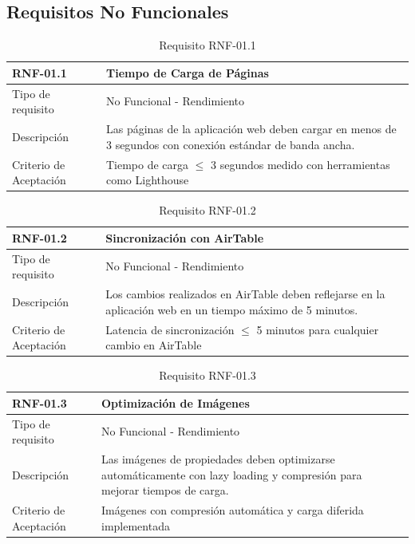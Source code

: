 \subsection{Requisitos No Funcionales}



\begin{table}[H]
\centering
\begin{tabular}{|p{3cm}|p{10cm}|}
\hline
\rowcolor{tealblue}
{\textbf{RNF-01.1}} & {\textbf{Tiempo de Carga de Páginas}} \\
\hline
Tipo de requisito & No Funcional - Rendimiento \\
\hline
Descripción & Las páginas de la aplicación web deben cargar en menos de 3 segundos con conexión estándar de banda ancha. \\
\hline
Criterio de Aceptación & Tiempo de carga $\leq$ 3 segundos medido con herramientas como Lighthouse \\
\hline
\end{tabular}
\caption{Requisito RNF-01.1}
\end{table}

\begin{table}[H]
\centering
\begin{tabular}{|p{3cm}|p{10cm}|}
\hline
\rowcolor{tealblue}
{\textbf{RNF-01.2}} & {\textbf{Sincronización con AirTable}} \\
\hline
Tipo de requisito & No Funcional - Rendimiento \\
\hline
Descripción & Los cambios realizados en AirTable deben reflejarse en la aplicación web en un tiempo máximo de 5 minutos. \\
\hline
Criterio de Aceptación & Latencia de sincronización $\leq$ 5 minutos para cualquier cambio en AirTable \\
\hline
\end{tabular}
\caption{Requisito RNF-01.2}
\end{table}

\begin{table}[H]
\centering
\begin{tabular}{|p{3cm}|p{10cm}|}
\hline
\rowcolor{tealblue}
{\textbf{RNF-01.3}} & {\textbf{Optimización de Imágenes}} \\
\hline
Tipo de requisito & No Funcional - Rendimiento \\
\hline
Descripción & Las imágenes de propiedades deben optimizarse automáticamente con lazy loading y compresión para mejorar tiempos de carga. \\
\hline
Criterio de Aceptación & Imágenes con compresión automática y carga diferida implementada \\
\hline
\end{tabular}
\caption{Requisito RNF-01.3}
\end{table}

